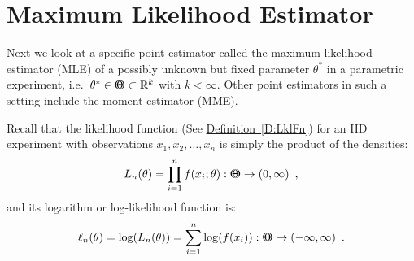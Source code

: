 


\chapter{Maximum Likelihood Estimator}

Next we look at a specific point estimator called the maximum likelihood estimator (MLE) of a possibly unknown but fixed parameter $\theta^*$ in a parametric experiment, i.e.~$\theta^* \in {\Theta}\mspace{-11 mu}{\Theta} \subset \mathbb{R}^k$ with $k < \infty$.  Other point estimators in such a setting include the moment estimator (MME). 

Recall that the likelihood function (See \hyperref[D:LklFn]{Definition~\ref*{D:LklFn}}) for an IID experiment with observations $x_1,x_2,\ldots,x_n$ is simply the product of the densities:
$$L_n(\theta)=\prod_{i=1}^n f(x_i;\theta) : {\Theta}\mspace{-11 mu}{\Theta} \to (0,\infty) \enspace , $$
and its logarithm or log-likelihood function is:
$$\ell_n(\theta)= \log(L_n(\theta)) = \sum_{i=1}^n \log(f(x_i)) :  {\Theta}\mspace{-11 mu}{\Theta} \to (-\infty,\infty) \enspace . $$

